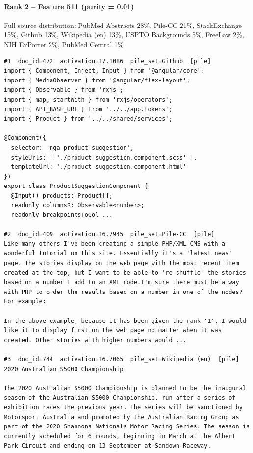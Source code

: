 \paragraph*{Rank 2 -- Feature 511 (purity = 0.01)}

Full source distribution: PubMed Abstracts 28\%, Pile-CC 21\%, StackExchange 15\%, Github 13\%, Wikipedia (en) 13\%, USPTO Backgrounds 5\%, FreeLaw 2\%, NIH ExPorter 2\%, PubMed Central 1\%

\begin{verbatim}
#1  doc_id=472  activation=17.1086  pile_set=Github  [pile]
import { Component, Inject, Input } from '@angular/core';
import { MediaObserver } from '@angular/flex-layout';
import { Observable } from 'rxjs';
import { map, startWith } from 'rxjs/operators';
import { API_BASE_URL } from '../../app.tokens';
import { Product } from '../../shared/services';

@Component({
  selector: 'nga-product-suggestion',
  styleUrls: [ './product-suggestion.component.scss' ],
  templateUrl: './product-suggestion.component.html'
})
export class ProductSuggestionComponent {
  @Input() products: Product[];
  readonly columns$: Observable<number>;
  readonly breakpointsToCol ...

#2  doc_id=409  activation=16.7945  pile_set=Pile-CC  [pile]
Like many others I've been creating a simple PHP/XML CMS with a wonderful tutorial on this site. Essentially it's a 'latest news' page. The stories display on the web page with the most recent item created at the top, but I want to be able to 're-shuffle' the stories based on a number I add to an XML node.I'm sure there must be a way with PHP to order the results based on a number in one of the nodes? For example:

In the above example, because it has been given the rank '1', I would like it to display first on the web page no matter when it was created. Other stories with higher numbers would ...

#3  doc_id=744  activation=16.7065  pile_set=Wikipedia (en)  [pile]
2020 Australian S5000 Championship

The 2020 Australian S5000 Championship is planned to be the inaugural season of the Australian S5000 Championship, run after a series of exhibition races the previous year. The series will be sanctioned by Motorsport Australia and promoted by the Australian Racing Group as part of the 2020 Shannons Nationals Motor Racing Series. The season is currently scheduled for 6 rounds, beginning in March at the Albert Park Circuit and ending on 13 September at Sandown Raceway.


\end{verbatim}

